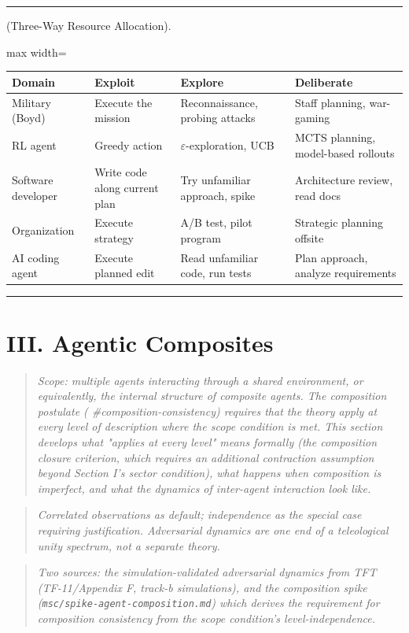 \documentclass[11pt,oneside]{article}
\newcounter{claim}[section]
\renewcommand{\theclaim}{\thesection.\arabic{claim}}
\newenvironment{segment}[2]{%
  \refstepcounter{claim}%
  \bigskip\noindent\hrule\smallskip
  \noindent{\bfseries #1~\theclaim}\enskip(#2).\par\smallskip
  \noindent\ignorespaces
}{%
  \par\smallskip\noindent\hrule\bigskip
}
\newenvironment{discussion}[1][]{\begin{segment}{Discussion}{#1}}{\end{segment}}
\begin{document}
\begin{discussion}[Three-Way Resource Allocation]
\begin{adjustbox}{max width=\textwidth}
\small
\begin{tabular}{llll}
\toprule
Domain & Exploit & Explore & Deliberate \\
\midrule
Military (Boyd) & Execute the mission & Reconnaissance, probing attacks & Staff planning, war-gaming \\
RL agent & Greedy action & $\varepsilon$-exploration, UCB & MCTS planning, model-based rollouts \\
Software developer & Write code along current plan & Try unfamiliar approach, spike & Architecture review, read docs \\
Organization & Execute strategy & A/B test, pilot program & Strategic planning offsite \\
AI coding agent & Execute planned edit & Read unfamiliar code, run tests & Plan approach, analyze requirements \\
\bottomrule
\end{tabular}
\end{adjustbox}


\end{discussion}

\section{III. Agentic Composites}

\begin{quote}\itshape
Scope: multiple agents interacting through a shared environment, or equivalently, the internal structure of composite agents. The composition postulate ( \#composition-consistency) requires that the theory apply at every level of description where the scope condition is met. This section develops what "applies at every level" means formally (the composition closure criterion, which requires an additional contraction assumption beyond Section I's sector condition), what happens when composition is imperfect, and what the dynamics of inter-agent interaction look like.
\end{quote}

\begin{quote}\itshape
Correlated observations as default; independence as the special case requiring justification. Adversarial dynamics are one end of a teleological unity spectrum, not a separate theory.
\end{quote}

\begin{quote}\itshape
Two sources: the simulation-validated adversarial dynamics from TFT (TF-11/Appendix F, track-b simulations), and the composition spike (\texttt{msc/spike-agent-composition.md}) which derives the requirement for composition consistency from the scope condition's level-independence.
\end{quote}
\end{document}
